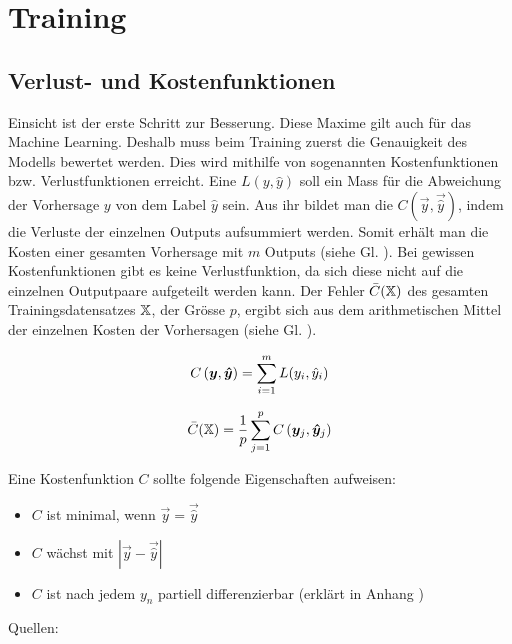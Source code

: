 \section{Training}
\subsection{Verlust- und Kostenfunktionen}
Einsicht ist der erste Schritt zur Besserung. Diese Maxime gilt auch für das
Machine Learning.
Deshalb muss beim Training zuerst die Genauigkeit des Modells bewertet werden.
Dies wird mithilfe von sogenannten Kostenfunktionen bzw. Verlustfunktionen erreicht.
\para{}
Eine  $L(y,\hat{y})$ soll ein Mass für die
Abweichung der Vorhersage $y$ von dem Label $\hat{y}$ sein.
Aus ihr bildet man die  $C(\vec{y},\vec{\hat{y}})$, indem die
Verluste der einzelnen Outputs aufsummiert werden. Somit erhält man die Kosten
einer gesamten Vorhersage mit $m$ Outputs (siehe Gl. ). Bei
gewissen Kostenfunktionen gibt es keine Verlustfunktion, da sich diese nicht auf die
einzelnen Outputpaare aufgeteilt werden kann.
Der Fehler $\bar{C}(\mathbb{X})$ des gesamten Trainingsdatensatzes $\mathbb{X}$, der
Grösse $p$, ergibt sich aus dem arithmetischen Mittel der einzelnen Kosten der
Vorhersagen (siehe Gl. ).
\\
\begin{minipage}[h!]{0.5\textwidth}
  \begin{equation}\label{eq:errorfunc}
    C \left(\bm{y},\bm{\hat{y}} \right) = \displaystyle\sum_{i=1}^{m} L(y_i, \hat{y}_i)
  \end{equation}
\end{minipage}
\begin{minipage}[h!]{0.5\textwidth}
  \begin{equation}\label{eq:meanerrorfunc}
    \bar{C}(\mathbb{X}) = \frac{1}{p}\displaystyle\sum_{j=1}^{p} C\left(\bm{y}_j,\bm{\hat{y}}_j\right)
  \end{equation}
\end{minipage}
\para{}
Eine Kostenfunktion $C$ sollte folgende Eigenschaften aufweisen:
\begin{itemize}
\item{$C$ ist minimal, wenn $\vec{y} = \vec{\hat{y}}$}
\item{$C$ wächst mit $|\vec{y} - \vec{\hat{y}}|$}
\item{$C$ ist nach jedem $y_n$ partiell differenzierbar (erklärt in Anhang )}
\end{itemize}
\para{}
Quellen: \cite{Nielsen} \cite{book:hands-on}

